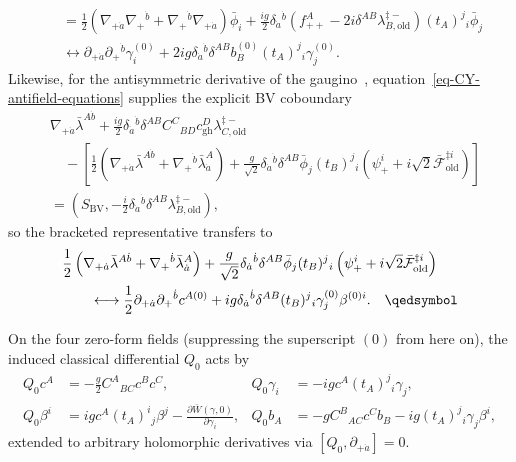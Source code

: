 \documentclass[11pt]{article}
\numberwithin{equation}{section}
\numberwithin{figure}{section}
\numberwithin{table}{section}
\begin{document}
\begin{proofbox}
\begin{equation}
\begin{aligned}
&\quad=\frac12\left(\nabla_{+\dot a}\nabla_+{}^{\dot b}
+\nabla_+{}^{\dot b}\nabla_{+\dot a}\right)\bar\phi_i
+\frac{ig}{2}\delta_{\dot a}{}^{\dot b}
 \left(f_{++}^A-2i\delta^{AB}\lambda_{B,\mathrm{old}}^{\ddagger-}\right)
 (t_A)^j{}_i\bar\phi_j\\
&\quad\longleftrightarrow
\partial_{+\dot a}\partial_+{}^{\dot b}\gamma_i^{(0)}
+2ig\delta_{\dot a}{}^{\dot b}\delta^{AB}b_B^{(0)}
 (t_A)^j{}_i\gamma_j^{(0)}.
\end{aligned}
\end{equation}
Likewise, for the antisymmetric derivative of the gaugino~\cite[Eq.~(2.4)]{ChangYin}, equation~\eqref{eq-CY-antifield-equations} supplies the explicit BV coboundary
\begin{equation}\label{eq-B-17}
\begin{aligned}
&\nabla_{+\dot a}\bar\lambda^{A\dot b}
+\frac{ig}{2}\delta_{\dot a}{}^{\dot b}\delta^{AB}
 C^C{}_{BD}c_{\mathrm{gh}}^D\lambda_{C,\mathrm{old}}^{\ddagger-}\\
&\quad-\left[\frac12\left(\nabla_{+\dot a}\bar\lambda^{A\dot b}
+\nabla_+{}^{\dot b}\bar\lambda_{\dot a}^A\right)
+\frac g{\sqrt2}\delta_{\dot a}{}^{\dot b}\delta^{AB}
 \bar\phi_j(t_B)^j{}_i
 \left(\psi_+^i+i\sqrt2\bar{\mathcal F}_{\mathrm{old}}^{\ddagger i}\right)\right]\\
&=\left(S_{\mathrm{BV}},
 -\frac i2\delta_{\dot a}{}^{\dot b}\delta^{AB}\lambda_{B,\mathrm{old}}^{\ddagger-}\right),
\end{aligned}
\end{equation}
so the bracketed representative transfers to
\begin{equation}\label{eq-CY-gaugino-transferred}
\begin{aligned}
&\frac12\left(\nabla_{+\dot a}\bar\lambda^{A\dot b}
+\nabla_+{}^{\dot b}\bar\lambda_{\dot a}^A\right)
+\frac g{\sqrt2}\delta_{\dot a}{}^{\dot b}\delta^{AB}
\bar\phi_j(t_B)^j{}_i
\left(\psi_+^i+i\sqrt2\bar{\mathcal F}_{\mathrm{old}}^{\ddagger i}\right)\\
&\qquad\longleftrightarrow
\frac12\partial_{+\dot a}\partial_+{}^{\dot b}c^{A(0)}
+ig\delta_{\dot a}{}^{\dot b}\delta^{AB}(t_B)^j{}_i
\gamma_j^{(0)}\beta^{(0)i}.\quad\qedsymbol
\end{aligned}
\end{equation}
\end{proofbox}

On the four zero-form fields (suppressing the superscript $(0)$ from here on), the induced classical differential $Q_0$ acts by
\begin{equation}\label{eq-B-15}
\begin{aligned}
Q_0c^A&=-\frac g2 C^A{}_{BC}c^Bc^C,
&Q_0\gamma_i&=-igc^A(t_A)^j{}_i\gamma_j,\\
Q_0\beta^i&=igc^A(t_A)^i{}_j\beta^j
-\frac{\partial\bar W(\gamma,0)}{\partial\gamma_i},
&Q_0b_A&=-gC^B{}_{AC}c^Cb_B
-ig(t_A)^j{}_i\gamma_j\beta^i,
\end{aligned}
\end{equation}
extended to arbitrary holomorphic derivatives via $[Q_0,\partial_{+\dot a}]=0$.
\end{document}
